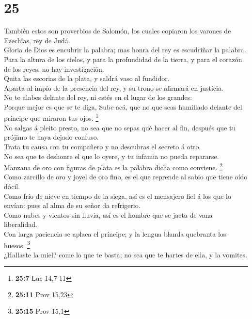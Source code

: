 \hypertarget{section-24}{%
\section{25}\label{section-24}}

 También estos son proverbios de Salomón, los cuales
copiaron los varones de Ezechîas, rey de Judá.\\
 Gloria de Dios es encubrir la palabra; mas honra del rey es
escudriñar la palabra.\\
 Para la altura de los cielos, y para la profundidad de la
tierra, y para el corazón de los reyes, no hay investigación.\\
 Quita las escorias de la plata, y saldrá vaso al
fundidor.\\
 Aparta al impío de la presencia del rey, y su trono se
afirmará en justicia.\\
 No te alabes delante del rey, ni estés en el lugar de los
grandes:\\
 Porque mejor es que se te diga, Sube acá, que no que seas
humillado delante del príncipe que miraron tus ojos. \footnote{\textbf{25:7}
  Luc 14,7-11}\\
 No salgas á pleito presto, no sea que no sepas qué hacer al
fin, después que tu prójimo te haya dejado confuso.\\
 Trata tu causa con tu compañero y no descubras el secreto á
otro.\\
 No sea que te deshonre el que lo oyere, y tu infamia no
pueda repararse.\\
 Manzana de oro con figuras de plata es la palabra dicha
como conviene. \footnote{\textbf{25:11} Prov 15,23}\\
 Como zarcillo de oro y joyel de oro fino, es el que
reprende al sabio que tiene oído dócil.\\
 Como frío de nieve en tiempo de la siega, así es el
mensajero fiel á los que lo envían: pues al alma de su señor da
refrigerio.\\
 Como nubes y vientos sin lluvia, así es el hombre que se
jacta de vana liberalidad.\\
 Con larga paciencia se aplaca el príncipe; y la lengua
blanda quebranta los huesos. \footnote{\textbf{25:15} Prov 15,1}\\
 ¿Hallaste la miel? come lo que te basta; no sea que te
hartes de ella, y la vomites.\\
